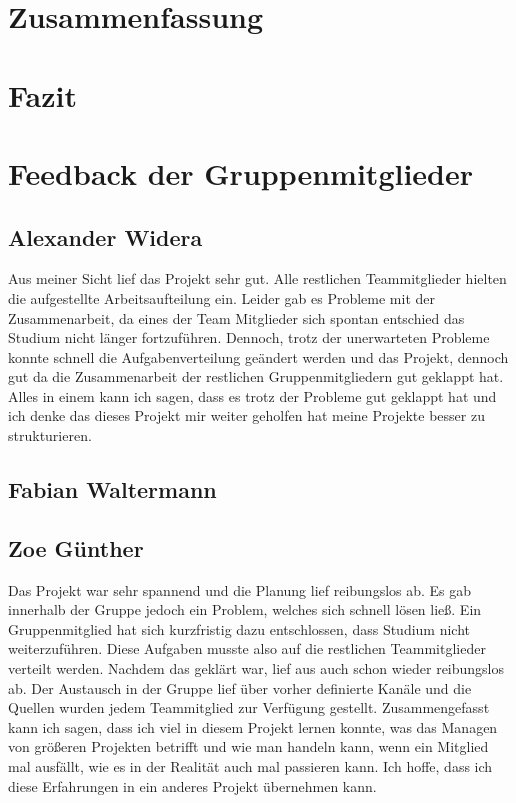 \documentclass[a4paper,12pt]{scrartcl}
\begin{document}
\section{Zusammenfassung}
\section{Fazit}

\section{Feedback der Gruppenmitglieder}
\subsection{Alexander Widera}
Aus meiner Sicht lief das Projekt sehr gut. Alle restlichen Teammitglieder hielten die aufgestellte Arbeitsaufteilung ein. Leider gab es Probleme mit der Zusammenarbeit, da eines der Team Mitglieder sich spontan entschied das Studium nicht länger fortzuführen. Dennoch, trotz der unerwarteten Probleme konnte schnell die Aufgabenverteilung geändert werden und das Projekt, dennoch gut da die Zusammenarbeit der restlichen Gruppenmitgliedern gut geklappt hat. Alles in einem kann ich sagen, dass es trotz der Probleme gut geklappt hat und ich denke das dieses Projekt mir weiter geholfen hat meine Projekte besser zu strukturieren.

\subsection{Fabian Waltermann}
\subsection{Zoe Günther}
Das Projekt war sehr spannend und die Planung lief reibungslos ab. Es gab innerhalb der Gruppe jedoch ein Problem, welches sich schnell lösen ließ. Ein Gruppenmitglied hat sich kurzfristig dazu entschlossen, dass Studium nicht weiterzuführen. Diese Aufgaben musste also auf die restlichen Teammitglieder verteilt werden. Nachdem das geklärt war, lief aus auch schon wieder reibungslos ab. Der Austausch in der Gruppe lief über vorher definierte Kanäle und die Quellen wurden jedem Teammitglied zur Verfügung gestellt.
Zusammengefasst kann ich sagen, dass ich viel in diesem Projekt lernen konnte, was das Managen von größeren Projekten betrifft und wie man handeln kann, wenn ein Mitglied mal ausfällt, wie es in der Realität auch mal passieren kann. Ich hoffe, dass ich diese Erfahrungen in ein anderes Projekt übernehmen kann.
\end{document}
